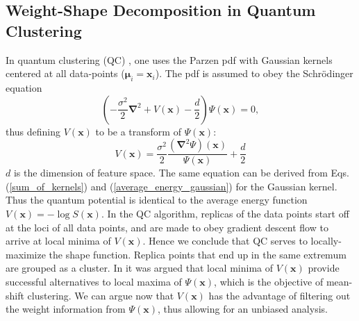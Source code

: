 \documentclass[preprint,12pt]{elsarticle}
\begin{document}
\subsection{Weight-Shape Decomposition in Quantum Clustering}
\label{qc}
In quantum clustering (QC) \cite{horn2001}, one uses the Parzen pdf with Gaussian kernels centered at all data-points ($\boldsymbol{\mu}_i=\mathbf{x}_i$). The pdf is assumed to obey the Schr{\"o}dinger equation
\begin{equation}\label{Schrodingers_equation}
  \left(-\frac{\sigma^2}{2}\boldsymbol{\nabla}^2+V\left(\mathbf{x}\right)-\frac{d}{2}\right)\Psi\left(\mathbf{x}\right)=0,
\end{equation}
thus defining $V\left(\mathbf{x}\right)$ to be a transform of $\Psi\left(\mathbf{x}\right)$:
\begin{equation}\label{Schrodingers_equation_potential}
  V\left(\mathbf{x}\right)=\frac{\sigma^2}{2}\frac{\left(\boldsymbol{\nabla}^2\Psi\right)\left(\mathbf{x}\right)}{\Psi\left(\mathbf{x}\right)}+\frac{d}{2}
\end{equation}
$d$ is the dimension of feature space. The same equation can be derived from Eqs. (\ref{sum_of_kernels}) and (\ref{average_energy_gaussian}) for the Gaussian kernel. Thus the quantum potential is identical to the average energy function $V\left(\mathbf{x}\right)=-\log S\left(\mathbf{x}\right)$. In the QC algorithm, replicas of the data points start off at the loci of all data points, and are made to obey gradient descent flow to arrive at local minima of $V\left(\mathbf{x}\right)$. Hence we conclude that QC serves to locally-maximize the shape function. Replica points that end up in the same extremum are grouped as a cluster. In \cite{horn2001} it was argued that local minima of $V\left(\mathbf{x}\right)$ provide successful alternatives to local maxima of $\Psi\left(\mathbf{x}\right)$, which is the objective of mean-shift clustering. We can argue now that $V\left(\mathbf{x}\right)$ has the advantage of filtering out the weight information from $\Psi\left(\mathbf{x}\right)$, thus allowing for an unbiased analysis.
\end{document}
